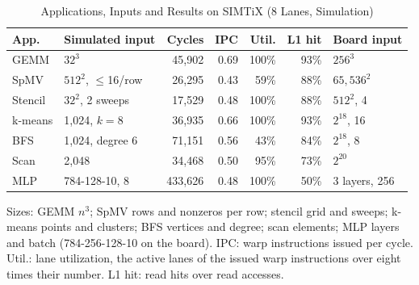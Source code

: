 \documentclass[journal]{IEEEtran}
\begin{document}
\begin{table}[t]
\caption{Applications, Inputs and Results on SIMTiX (8 Lanes, Simulation)}
\label{tab:apps}
\centering\footnotesize
\setlength{\tabcolsep}{2.6pt}
\begin{tabular}{llrrrrl}
\toprule
App. & Simulated input & Cycles & IPC & Util. & L1 hit & Board input\\
\midrule
GEMM    & $32^3$               & 45,902  & 0.69 & 100\% & 93\% & $256^3$\\
SpMV    & $512^2$, $\le$16/row & 26,295  & 0.43 & 59\%  & 88\% & $65{,}536^2$\\
Stencil & $32^2$, 2 sweeps     & 17,529  & 0.48 & 100\% & 88\% & $512^2$, 4\\
k-means & 1,024, $k=8$         & 36,935  & 0.66 & 100\% & 93\% & $2^{18}$, 16\\
BFS     & 1,024, degree 6      & 71,151  & 0.56 & 43\%  & 84\% & $2^{18}$, 8\\
Scan    & 2,048                & 34,468  & 0.50 & 95\%  & 73\% & $2^{20}$\\
MLP     & 784-128-10, 8        & 433,626 & 0.48 & 100\% & 50\% & 3 layers, 256\\
\bottomrule
\end{tabular}

\vspace{2pt}
\begin{minipage}{\columnwidth}\footnotesize
Sizes: GEMM $n^3$; SpMV rows and nonzeros per row; stencil grid and sweeps;
k-means points and clusters; BFS vertices and degree; scan elements; MLP layers
and batch (784-256-128-10 on the board). IPC: warp instructions issued per cycle. Util.: lane utilization, the
active lanes of the issued warp instructions over eight times their number. L1
hit: read hits over read accesses.
\end{minipage}
\end{table}
\end{document}

